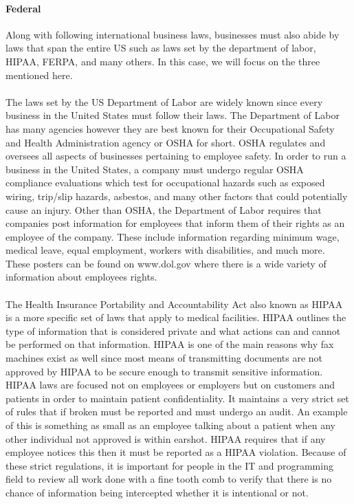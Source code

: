 \documentclass[a4paper,12pt]{article}
\begin{document}
\paragraph{Federal}Along with following international business laws, businesses must also abide by laws that span the entire US such as laws set by the department of labor, HIPAA, FERPA, and many others. In this case, we will focus on the three mentioned here.
\paragraph{}The laws set by the US Department of Labor are widely known since every business in the United States must follow their laws. The Department of Labor has many agencies however they are best known for their Occupational Safety and Health Administration agency or OSHA for short. OSHA regulates and oversees all aspects of businesses pertaining to employee safety. In order to run a business in the United States, a company must undergo regular OSHA compliance evaluations which test for occupational hazards such as exposed wiring, trip/slip hazards, asbestos, and many other factors that could potentially cause an injury. Other than OSHA, the Department of Labor requires that companies post information for employees that inform them of their rights as an employee of the company. These include information regarding minimum wage, medical leave, equal employment, workers with disabilities, and much more. These posters can be found on www.dol.gov where there is a wide variety of information about employees rights.
\paragraph{}The Health Insurance Portability and Accountability Act also known as HIPAA is a more specific set of laws that apply to medical facilities. HIPAA outlines the type of information that is considered private and what actions can and cannot be performed on that information. HIPAA is one of the main reasons why fax machines exist as well since most means of transmitting documents are not approved by HIPAA to be secure enough to transmit sensitive information. HIPAA laws are focused not on employees or employers but on customers and patients in order to maintain patient confidentiality. It maintains a very strict set of rules that if broken must be reported and must undergo an audit. An example of this is something as small as an employee talking about a patient when any other individual not approved is within earshot. HIPAA requires that if any employee notices this then it must be reported as a HIPAA violation. Because of these strict regulations, it is important for people in the IT and programming field to review all work done with a fine tooth comb to verify that there is no chance of information being intercepted whether it is intentional or not.
\end{document}
